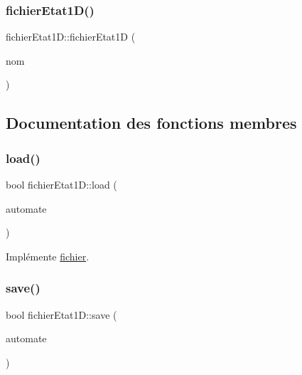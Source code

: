 \subsubsection{\texorpdfstring{fichier\+Etat1\+D()}{fichierEtat1D()}}
{\footnotesize\ttfamily fichier\+Etat1\+D\+::fichier\+Etat1D (\begin{DoxyParamCaption}\item[{const std\+::string}]{nom }\end{DoxyParamCaption})\hspace{0.3cm}{\ttfamily [inline]}}



\subsection{Documentation des fonctions membres}
\mbox{\label{classfichier_etat1_d_a06c7ac08352e595eda7df415e50e66f8}} 
\subsubsection{\texorpdfstring{load()}{load()}}
{\footnotesize\ttfamily bool fichier\+Etat1\+D\+::load (\begin{DoxyParamCaption}\item[{const \mbox{\hyperlink{class_cellular_automata}{Cellular\+Automata}} $\ast$}]{automate }\end{DoxyParamCaption})\hspace{0.3cm}{\ttfamily [virtual]}}



Implémente \mbox{\hyperlink{classfichier_a6c246db929cf6532eb3f12c2b39574d5}{fichier}}.

\mbox{\label{classfichier_etat1_d_a120ee4b6234a18bdb88c5d60bd0ef5c0}} 
\subsubsection{\texorpdfstring{save()}{save()}}
{\footnotesize\ttfamily bool fichier\+Etat1\+D\+::save (\begin{DoxyParamCaption}\item[{const \mbox{\hyperlink{class_cellular_automata}{Cellular\+Automata}} \&}]{automate }\end{DoxyParamCaption})\hspace{0.3cm}{\ttfamily [virtual]}}




